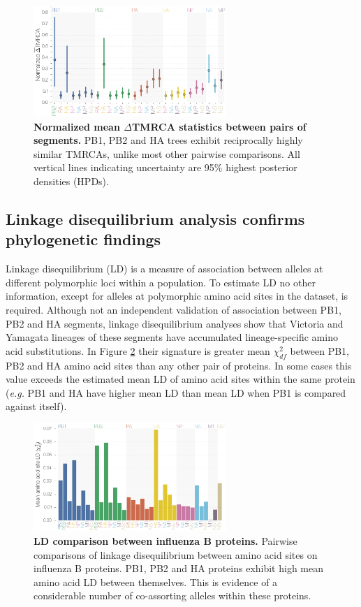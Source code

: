 \documentclass[11pt,oneside,letterpaper]{article}
\begin{document}
\begin{figure}[h]
	\centering		
	\includegraphics[width=0.65\textwidth]{figures/InfB_normalizedMuDeltaTMRCA.png}
	\caption{\textbf{Normalized mean $\Delta$TMRCA statistics between pairs of segments.}
PB1, PB2 and HA trees exhibit reciprocally highly similar TMRCAs, unlike most other pairwise comparisons.
All vertical lines indicating uncertainty are 95\% highest posterior densities (HPDs).}
	\label{deltaTMRCA}
\end{figure}

\subsection*{Linkage disequilibrium analysis confirms phylogenetic findings}
Linkage disequilibrium (LD) is a measure of association between alleles at different polymorphic loci within a population.
To estimate LD no other information, except for alleles at polymorphic amino acid sites in the dataset, is required.
Although not an independent validation of association between PB1, PB2 and HA segments, linkage disequilibrium analyses show that Victoria and Yamagata lineages of these segments have accumulated lineage-specific amino acid substitutions.
In Figure \ref{segmentLD} their signature is greater mean $\chi^{2}_{df}$ between PB1, PB2 and HA amino acid sites than any other pair of proteins.
In some cases this value exceeds the estimated mean LD of amino acid sites within the same protein (\textit{e.g.} PB1 and HA have higher mean LD than mean LD when PB1 is compared against itself).

\begin{figure}[h]
	\centering	
	\includegraphics[width=0.65\textwidth]{figures/InfB_aaMeanLD.png}
	\caption{\textbf{LD comparison between influenza B proteins.}
Pairwise comparisons of linkage disequilibrium between amino acid sites on influenza B proteins.
PB1, PB2 and HA proteins exhibit high mean amino acid LD between themselves.
This is evidence of a considerable number of co-assorting alleles within these proteins.}
	\label{segmentLD}
\end{figure}
\end{document}
